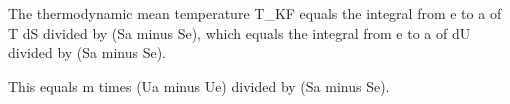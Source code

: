 The thermodynamic mean temperature T_KF equals the integral from e to a of T dS divided by (Sa minus Se), which equals the integral from e to a of dU divided by (Sa minus Se).  

This equals m times (Ua minus Ue) divided by (Sa minus Se).